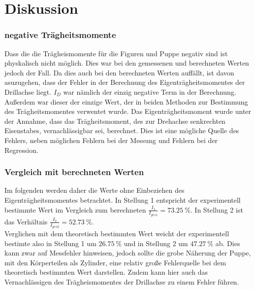 \section{Diskussion}
\label{sec:Diskussion}
    \subsubsection{negative Trägheitsmomente}
    Dass die die Trägheismomente für die Figuren und Puppe negativ sind ist physkalisch nicht möglich.
    Dies war bei den gemessenen und berechneten Werten jedoch der Fall.
    Da dies auch bei den berechneten Werten auffällt, ist davon asuzugehen, dass der Fehler in der Berechnung des Eigenträgheitsmomentes der Drillachse liegt.
    $I_D$ war nämlich der einzig negative Term in der Berechnung.
    Außerdem war dieser der einzige Wert, der in beiden Methoden zur Bestimmung des Trägheitsmomentes verwentet wurde.
    Das Eigenträgheitsmoment wurde unter der Annahme, dass das Trägheitsmoment, des zur Drehachse senkrechten Eisenstabes, vernachlässigbar sei, berechnet.
    Dies ist eine mögliche Quelle des Fehlers, neben möglichen Fehlern bei der Messung und Fehlern bei der Regression.\\ 

    \subsubsection{Vergleich mit berechneten Werten}
    Im folgenden werden daher die Werte ohne Einbeziehen des Eigenträgheitsmomentes betrachtet.
    In Stellung 1 entspricht der experimentell bestimmte Wert im Vergleich zum berechneten $\frac{I_1}{I_{ges1}}=\qty{73.25}{\percent}$.\;
    In Stellung 2 ist das Verhältnis $\frac{I_2}{I_{ges2}}=\qty{52.73}{\percent}$.\\
    Verglichen mit dem theoretisch bestimmten Wert weicht der experimentell bestimte also in Stellung 1 um $\qty{26.75}{\percent}$ und in Stellung 2 um $\qty{47.27}{\percent}$ ab.
    Dies kann zwar auf Messfehler hinweisen, jedoch sollte die grobe Näherung der Puppe, mit den Körperteilen als Zylinder, eine relativ große Fehlerquelle bei dem theoretisch bestimmten Wert darstellen.
    Zudem kann hier auch das Vernachlässigen des Trägheismomentes der Drillachse zu einem Fehler führen.